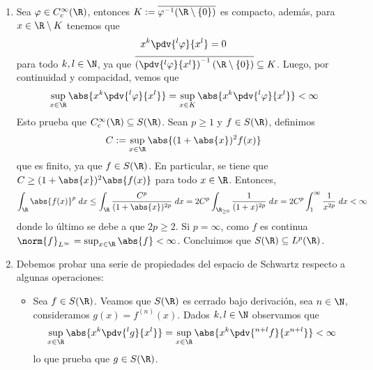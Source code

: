 \documentclass{article}
\begin{document}
\begin{enumerate}
    \item Sea $\varphi\in C_{c}^{\infty}(\R)$, entonces 
    $K:=\overline{\varphi^{-1}(\R\setminus\{0\})}$ es compacto, además, para $x\in\R\setminus K$ 
    tenemos que
    \begin{equation*}
        x^{k}\pdv{^{l}\varphi}{x^{l}}=0
    \end{equation*}
    para todo $k,l\in\N$, ya que $\overline{\left(\pdv{^{l}\varphi}{x^{l}}\right)^{-1}
    (\R\setminus\{0\})}\subseteq K$. Luego, por continuidad y compacidad, vemos que
    \begin{equation*}
        \sup_{x\in\R}\abs{x^{k}\pdv{^{l}\varphi}{x^{l}}}
        =\sup_{x\in K}\abs{x^{k}\pdv{^{l}\varphi}{x^{l}}}<\infty
    \end{equation*}
    Esto prueba que $C_{c}^{\infty}(\R)\subseteq S(\R)$. Sean $p\geq1$ y $f\in S(\R)$, definimos
    \begin{equation*}
        C:=\sup_{x\in\R}\abs{(1+\abs{x})^{2}f(x)}
    \end{equation*}
    que es finito, ya que $f\in S(\R)$. En particular, se tiene que 
    $C\geq(1+\abs{x})^{2}\abs{f(x)}$ para todo $x\in\R$. Entonces,
    \begin{equation*}
        \int_{\R}\abs{f(x)}^{p}\hspace{1mm}dx\leq\int_{\R}\frac{C^{p}}{(1+\abs{x})^{2p}}
        \hspace{1mm}dx=2C^{p}\int_{\R_{\geq0}}\frac{1}{(1+x)^{2p}}\hspace{1mm}dx
        =2C^{p}\int_{1}^{\infty}\frac{1}{x^{2p}}\hspace{1mm}dx<\infty
    \end{equation*}
    donde lo último se debe a que $2p\geq2$. Si $p=\infty$, como $f$ es continua 
    $\norm{f}_{L^{\infty}}=\sup_{x\in\R}\abs{f}<\infty$. Concluimos que 
    $S(\R)\subseteq L^{p}(\R)$.
    
    \item Debemos probar una serie de propiedades del espacio de Schwartz respecto a algunas 
    operaciones:
    \begin{itemize}
        \item Sea $f\in S(\R)$. Veamos que $S(\R)$ es cerrado bajo derivación, sea $n\in\N$, 
        consideramos $g(x)=f^{(n)}(x)$. Dados $k,l\in\N$ observamos que
        \begin{equation*}
            \sup_{x\in\R}\abs{x^{k}\pdv{^{l}g}{x^{l}}}
            =\sup_{x\in\R}\abs{x^{k}\pdv{^{n+l}f}{x^{n+l}}}<\infty
        \end{equation*}
        lo que prueba que $g\in S(\R)$.


\end{itemize}
\end{enumerate}
\end{document}
